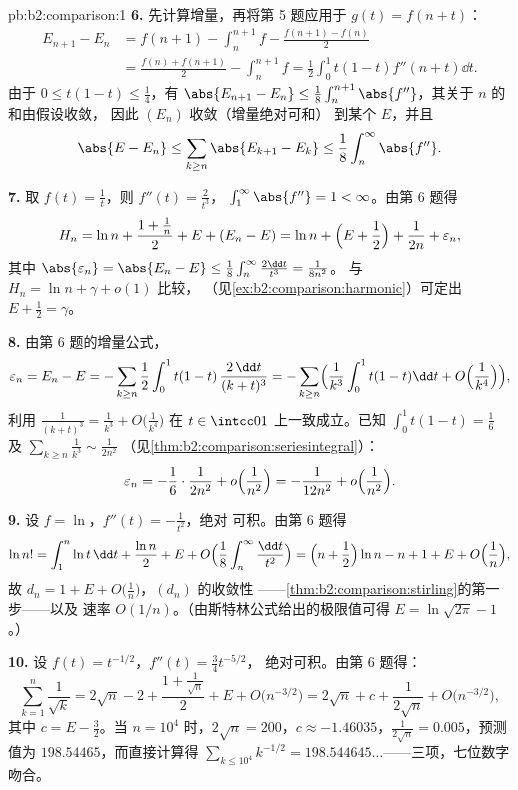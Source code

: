 \begin{solution}{pb:b2:comparison:1}
\textbf{6.} 先计算增量，再将第 5 题应用于
$g(t) = f(n + t)$：
\begin{align*}
E_{n+1} - E_n
&= f(n{+}1) - \int_n^{n+1}\!f - \frac{f(n{+}1) - f(n)}2 \\
&= \frac{f(n) + f(n{+}1)}2 - \int_n^{n+1}\!f
= \frac12\int_0^1 t(1-t)f''(n+t)\dd t .
\end{align*}
由于 $0 \leq t(1-t) \leq \frac14$，有 $\abs{E_{n+1} - E_n} \leq
\frac18\int_n^{n+1}\abs{f''}$，其关于 $n$ 的和由假设收敛，
因此 $(E_n)$ 收敛（增量绝对可和）
到某个 $E$，并且
\[
\abs{E - E_n} \leq \sum_{k\geq n}\abs{E_{k+1} - E_k} \leq
\frac18\int_n^\infty\abs{f''} .
\]

\textbf{7.} 取 $f(t) = \frac1t$，则 $f''(t) = \frac2{t^3}$，
$\int_1^\infty\abs{f''} = 1 < \infty$。由第 6 题得
\[
H_n = \ln n + \frac{1 + \frac1n}{2} + E + (E_n - E)
= \ln n + \Bigl(E + \frac12\Bigr) + \frac1{2n} +
\varepsilon_n,
\]
其中 $\abs{\varepsilon_n} = \abs{E_n - E} \leq
\frac18\int_n^\infty\frac{2\dd t}{t^3} = \frac1{8n^2}$。
与 $H_n = \ln n + \gamma + o(1)$ 比较，
（见\cref{ex:b2:comparison:harmonic}）可定出 $E + \frac12 =
\gamma$。

\textbf{8.} 由第 6 题的增量公式，
\[
\varepsilon_n = E_n - E = -\sum_{k\geq n}\frac12\int_0^1
t(1-t)\,\frac{2\,\dd t}{(k+t)^3}
= -\sum_{k \geq n}\Bigl(\frac1{k^3}\int_0^1t(1-t)\dd t +
O\Bigl(\frac1{k^4}\Bigr)\Bigr),
\]
利用 $\frac{1}{(k+t)^3} = \frac1{k^3} +
O\bigl(\frac1{k^4}\bigr)$ 在 $t \in \intcc01$ 上一致成立。已知
$\int_0^1 t(1-t) = \frac16$ 及
$\sum_{k\geq n}\frac1{k^3} \sim \frac{1}{2n^2}$
（见\cref{thm:b2:comparison:seriesintegral}）：
\[
\varepsilon_n = -\frac16\cdot\frac{1}{2n^2} +
o\Bigl(\frac1{n^2}\Bigr) = -\frac{1}{12n^2} +
o\Bigl(\frac{1}{n^2}\Bigr).
\]

\textbf{9.} 设 $f = \ln$，$f''(t) = -\frac1{t^2}$，绝对
可积。由第 6 题得
\[
\ln n! = \int_1^n\ln t\,\dd t + \frac{\ln n}2 + E + O\Bigl(
\frac1{8}\int_n^\infty\frac{\dd t}{t^2}\Bigr)
= \Bigl(n + \frac12\Bigr)\ln n - n + 1 + E +
O\Bigl(\frac1n\Bigr),
\]
故 $d_n = 1 + E + O\bigl(\frac1n\bigr)$，$(d_n)$ 的收敛性
——\cref{thm:b2:comparison:stirling}的第一步——以及
速率 $O(1/n)$。（由斯特林公式给出的极限值可得 $E =
\ln\sqrt{2\pi} - 1$。）

\textbf{10.} 设 $f(t) = t^{-1/2}$，$f''(t) = \frac34 t^{-5/2}$，
绝对可积。由第 6 题得：
\[
\sum_{k=1}^n \frac1{\sqrt k}
= 2\sqrt n - 2 + \frac{1 + \frac1{\sqrt n}}2 + E +
O\bigl(n^{-3/2}\bigr)
= 2\sqrt n + c + \frac{1}{2\sqrt n} +
O\bigl(n^{-3/2}\bigr),
\]
其中 $c = E - \frac32$。当 $n = 10^4$ 时，$2\sqrt n = 200$，$c
\approx -1.46035$，$\frac1{2\sqrt n} = 0.005$，预测值为
$198.54465$，而直接计算得 $\sum_{k\leq10^4}k^{-1/2} =
198.544645\dots$——三项，七位数字吻合。


\end{solution}

